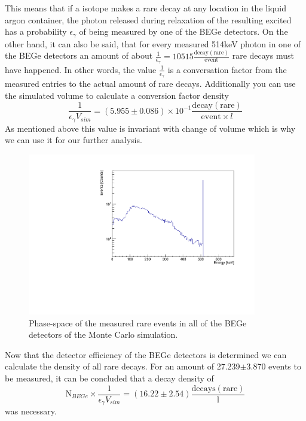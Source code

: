 This means that if a  isotope makes a rare decay at any location in the liquid argon container, the photon released during relaxation of the resulting excited  has a probability \(\epsilon_\gamma\) of being measured by one of the BEGe detectors.
On the other hand, it can also be said, that for every measured 514keV photon in one of the BEGe detectors an amount of about $\frac{1}{\epsilon_\gamma} = 10515 \frac{\mathrm{decay(rare)}}{\mathrm{event}}$  rare  decays must have happened.
In other words, the value $\frac{1}{\epsilon_\gamma}$ is a conversation factor from the measured entries to the actual amount of rare decays.
Additionally you can use the simulated volume to calculate a conversion factor density 
\begin{equation*}
\frac{1}{\epsilon_\gamma V_{sim}} = (5.955\pm0.086) \times 10^{-1} \frac{\mathrm{decay(rare)}}{\mathrm{event} \times l}
\end{equation*}
As mentioned above this value is invariant with change of volume which is why we can use it for our further analysis. 
\\

\begin{figure}[t!]
	\centering
	\ifmakefigures%
	\includegraphics[width=100mm]{./Bilder/MC-514-Phasenraum.pdf}
	\fi%
	\caption{\label{fig:PhasenraumMC514}
    Phase-space of the measured rare  events in all of the BEGe detectors of the Monte Carlo simulation.
	}
\end{figure}

Now that the detector efficiency of the BEGe detectors is determined we can calculate the density of all rare  decays.
For an amount of 27.239\(\pm\)3.870 events to be measured, it can be concluded that a decay density of
\begin{equation*}
\mathrm{N}_{BEGe}\times\frac{1}{\epsilon_\gamma V_{sim}} = (16.22\pm2.54) \frac{\mathrm{decays(rare)}}{\mathrm{l}} 
\end{equation*}
was necessary.
\\

